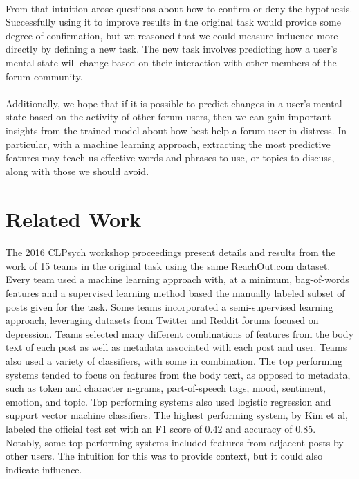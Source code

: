 \documentclass{article}
\begin{document}
\paragraph{}From that intuition arose questions about how to confirm or deny the hypothesis. Successfully using it to improve results in the original task would provide some degree of confirmation, but we reasoned that we could measure influence more directly by defining a new task. The new task involves predicting how a user's mental state will change based on their interaction with other members of the forum community.

\paragraph{}Additionally, we hope that if it is possible to predict changes in a user's mental state based on the activity of other forum users, then we can gain important insights from the trained model about how best help a forum user in distress. In particular, with a machine learning approach, extracting the most predictive features may teach us effective words and phrases to use, or topics to discuss, along with those we should avoid.

\section{Related Work}

\paragraph{}The 2016 CLPsych workshop proceedings present details and results from the work of 15 teams in the original task using the same ReachOut.com dataset. Every team used a machine learning approach with, at a minimum, bag-of-words features and a supervised learning method based the manually labeled subset of posts given for the task. Some teams incorporated a semi-supervised learning approach, leveraging datasets from Twitter and Reddit forums focused on depression. Teams selected many different combinations of features from the body text of each post as well as metadata associated with each post and user. Teams also used a variety of classifiers, with some in combination\cite{milne}. The top performing systems tended to focus on features from the body text, as opposed to metadata, such as token and character n-grams, part-of-speech tags, mood, sentiment, emotion, and topic. Top performing systems also used logistic regression and support vector machine classifiers. The highest performing system, by Kim et al, labeled the official test set with an F1 score of 0.42 and accuracy of 0.85\cite{kim}. Notably, some top performing systems included features from adjacent posts by other users. The intuition for this was to provide context, but it could also indicate influence.
\end{document}
